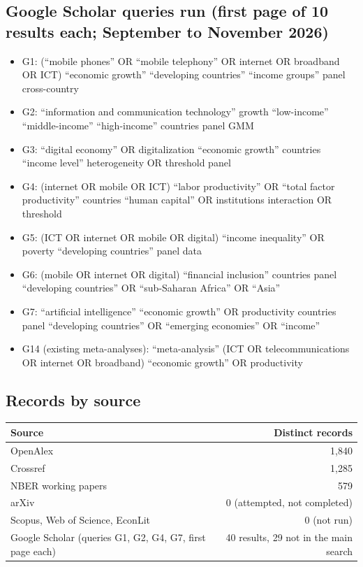 \subsection*{Google Scholar queries run (first page of 10 results each; September to November 2026)}
{\scriptsize\begin{itemize}[leftmargin=1.2em,itemsep=1pt]
\item G1: (``mobile phones'' OR ``mobile telephony'' OR internet OR broadband OR ICT) ``economic growth'' ``developing countries'' ``income groups'' panel cross-country
\item G2: ``information and communication technology'' growth ``low-income'' ``middle-income'' ``high-income'' countries panel GMM
\item G3: ``digital economy'' OR digitalization ``economic growth'' countries ``income level'' heterogeneity OR threshold panel
\item G4: (internet OR mobile OR ICT) ``labor productivity'' OR ``total factor productivity'' countries ``human capital'' OR institutions interaction OR threshold
\item G5: (ICT OR internet OR mobile OR digital) ``income inequality'' OR poverty ``developing countries'' panel data
\item G6: (mobile OR internet OR digital) ``financial inclusion'' countries panel ``developing countries'' OR ``sub-Saharan Africa'' OR ``Asia''
\item G7: ``artificial intelligence'' ``economic growth'' OR productivity countries panel ``developing countries'' OR ``emerging economies'' OR ``income''
\item G14 (existing meta-analyses): ``meta-analysis'' (ICT OR telecommunications OR internet OR broadband) ``economic growth'' OR productivity
\end{itemize}}
\subsection*{Records by source}
\begin{tabular}{@{}lr@{}}\toprule Source & Distinct records\\\midrule OpenAlex & 1,840\\ Crossref & 1,285\\ NBER working papers & 579\\ arXiv & 0 (attempted, not completed)\\ Scopus, Web of Science, EconLit & 0 (not run)\\ Google Scholar (queries G1, G2, G4, G7, first page each) & 40 results, 29 not in the main search\\\bottomrule\end{tabular}
